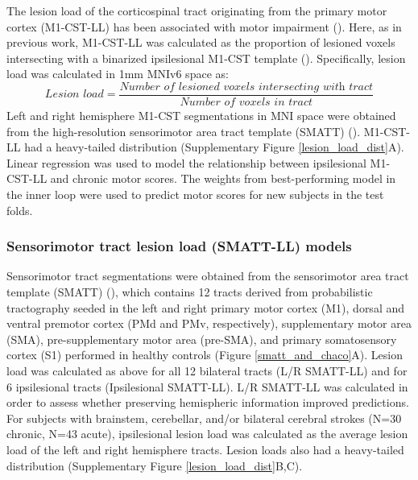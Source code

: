 \documentclass[10pt]{article}
\begin{document}
The lesion load of the corticospinal tract originating from the primary motor cortex (M1-CST-LL) has been associated with motor impairment (\cite{Stinear2017-eg}). Here, as in previous work, M1-CST-LL was calculated as the proportion of lesioned voxels intersecting with a binarized ipsilesional M1-CST template (\cite{Zhu2010-qh}). Specifically, lesion load was calculated in 1mm MNIv6 space as:
\begin{equation}
    \textit{Lesion load} = \frac{\textit{Number of lesioned voxels intersecting with  tract}}{\textit{Number of voxels in tract}}
\end{equation}
Left and right hemisphere M1-CST segmentations in MNI space were obtained from the high-resolution sensorimotor area tract template (SMATT) (\cite{Archer2018-ti}). M1-CST-LL had a heavy-tailed distribution (Supplementary Figure \ref{lesion_load_dist}A).
Linear regression was used to model the relationship between ipsilesional M1-CST-LL and chronic motor scores. The weights from best-performing model in the inner loop were used to predict motor scores for new subjects in the test folds. 

\subsubsection*{Sensorimotor tract lesion load (SMATT-LL) models}
Sensorimotor tract segmentations were obtained from the sensorimotor area tract template (SMATT) (\cite{Archer2018-ti}), which contains 12 tracts derived from probabilistic tractography seeded in the left and right primary motor cortex (M1), dorsal and ventral premotor cortex (PMd and PMv, respectively), supplementary motor area (SMA), pre-supplementary motor area (pre-SMA), and primary somatosensory cortex (S1) performed in healthy controls (Figure \ref{smatt_and_chaco}A). Lesion load was calculated as above for all 12 bilateral tracts (L/R SMATT-LL) and for 6 ipsilesional tracts (Ipsilesional SMATT-LL). L/R SMATT-LL was calculated in order to assess whether preserving hemispheric information improved predictions. For subjects with brainstem, cerebellar, and/or bilateral cerebral strokes (N=30 chronic, N=43 acute), ipsilesional lesion load was calculated as the average lesion load of the left and right hemisphere tracts. Lesion loads also had a heavy-tailed distribution (Supplementary Figure \ref{lesion_load_dist}B,C). 
\end{document}
